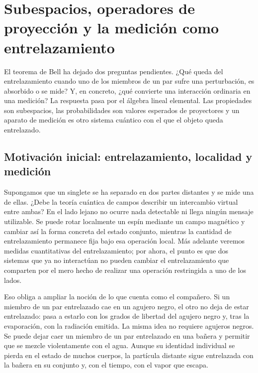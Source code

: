 \chapter{Subespacios, operadores de proyección y la medición como entrelazamiento}

El teorema de Bell ha dejado dos preguntas pendientes. ¿Qué queda del entrelazamiento cuando uno de los miembros de un par sufre una perturbación, es absorbido o se mide? Y, en concreto, ¿qué convierte una interacción ordinaria en una medición? La respuesta pasa por el álgebra lineal elemental. Las propiedades son subespacios, las probabilidades son valores esperados de proyectores y un aparato de medición es otro sistema cuántico con el que el objeto queda entrelazado.

\section{Motivación inicial: entrelazamiento, localidad y medición}

Supongamos que un singlete se ha separado en dos partes distantes y se mide una de ellas. ¿Debe la teoría cuántica de campos describir un intercambio virtual entre ambas? En el lado lejano no ocurre nada detectable ni llega ningún mensaje utilizable. Se puede rotar localmente un espín mediante un campo magnético y cambiar así la forma concreta del estado conjunto, mientras la cantidad de entrelazamiento permanece fija bajo esa operación local. Más adelante veremos medidas cuantitativas del entrelazamiento; por ahora, el punto es que dos sistemas que ya no interactúan no pueden cambiar el entrelazamiento que comparten por el mero hecho de realizar una operación restringida a uno de los lados.

\begin{classroomqa}\end{classroomqa}

Eso obliga a ampliar la noción de lo que cuenta como el compañero. Si un miembro de un par entrelazado cae en un agujero negro, el otro no deja de estar entrelazado: pasa a estarlo con los grados de libertad del agujero negro y, tras la evaporación, con la radiación emitida. La misma idea no requiere agujeros negros. Se puede dejar caer un miembro de un par entrelazado en una bañera y permitir que se mezcle violentamente con el agua. Aunque su identidad individual se pierda en el estado de muchos cuerpos, la partícula distante sigue entrelazada con la bañera en su conjunto y, con el tiempo, con el vapor que escapa.

